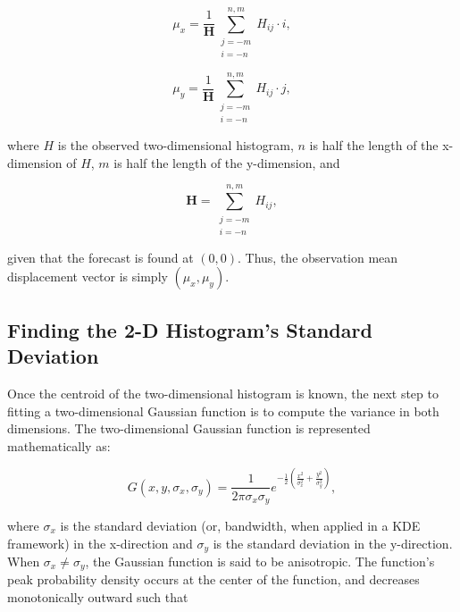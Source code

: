     \begin{equation}
        \label{mux}
        \mu_x = \frac{1}{\mathbf{H}} \sum\limits_{\substack{j=-m \\ i=-n}}^{n,m}H_{ij} \cdot i,
    \end{equation}

    \begin{equation}
        \label{muy}
        \mu_y = \frac{1}{\mathbf{H}} \sum\limits_{\substack{j=-m \\ i=-n}}^{n,m}H_{ij} \cdot j,
    \end{equation}

\noindent where $H$ is the observed two-dimensional histogram, $n$ is half the length of the x-dimension of $H$, $m$ is half the length of the y-dimension, and

    \begin{equation}
        \mathbf{H} = \sum\limits_{\substack{j=-m \\ i=-n}}^{n,m} H_{ij},
    \end{equation}

\noindent given that the forecast is found at $(0, 0)$.
Thus, the observation mean displacement vector is simply $(\mu_x, \mu_y)$.




\subsection{Finding the 2-D Histogram's Standard Deviation}
\label{std}

Once the centroid of the two-dimensional histogram is known, the next step to fitting a two-dimensional Gaussian function is to compute the variance in both dimensions.
The two-dimensional Gaussian function is represented mathematically as:

    \begin{equation}
        \label{2DGauss}
        G(x, y, \sigma_x, \sigma_y) = \frac{1}{2 \pi \sigma_x \sigma_y} e^{- \frac{1}{2} \left( \frac{x^2}{\sigma_x^2} + \frac{y^2}{\sigma_y^2} \right)},
    \end{equation}

\noindent where $\sigma_x$ is the standard deviation (or, bandwidth, when applied in a KDE framework) in the x-direction and $\sigma_y$ is the standard deviation in the y-direction.
When $\sigma_x \neq \sigma_y$, the Gaussian function is said to be anisotropic.
The function's peak probability density occurs at the center of the function, and decreases monotonically outward such that

